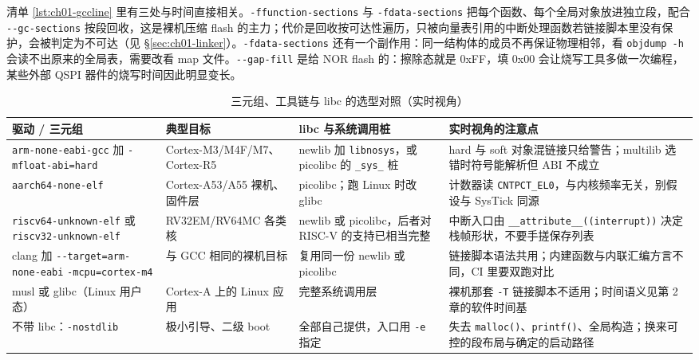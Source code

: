 \documentclass[12pt,a4paper,fontset=fandol]{ctexbook}
\newcommand{\Fn}[1]{\texttt{#1()}}
\newcommand{\Tp}[1]{\texttt{#1}}
\newcommand{\Opt}[1]{\texttt{-\/-#1}}
\newcommand{\Bk}{\discretionary{}{}{}}
\begin{document}
清单 \ref{lst:ch01-gccline} 里有三处与时间直接相关。\Tp{-ffunction-sections} 与 \Tp{-fdata-sections} 把每个函数、每个全局对象放进独立段，配合 \Opt{gc-sections} 按段回收，这是裸机压缩 flash 的主力；代价是回收按可达性遍历，只被向量表引用的中断处理函数若链接脚本里没有保护，会被判定为不可达（见 \S\ref{sec:ch01-linker}）。\Tp{-fdata-sections} 还有一个副作用：同一结构体的成员不再保证物理相邻，看 \Tp{objdump -h} 会读不出原来的全局表，需要改看 map 文件。\Opt{gap-fill} 是给 NOR flash 的：擦除态就是 0xFF，填 0x00 会让烧写工具多做一次编程，某些外部 QSPI 器件的烧写时间因此明显变长。

\begin{table}[htbp]
\centering
\caption{三元组、工具链与 libc 的选型对照（实时视角）}
\label{tab:ch01-toolchain}
\begin{tabular}{>{\raggedright\arraybackslash}p{}
                >{\raggedright\arraybackslash}p{}
                >{\raggedright\arraybackslash}p{}
                >{\raggedright\arraybackslash}p{}}
\toprule
驱动 / 三元组 & 典型目标 & libc 与系统调用桩 & 实时视角的注意点 \\
\midrule
\Tp{arm-none-eabi-gcc} 加 \Tp{-mfloat-abi=hard} & Cortex-M3/M4F/M7、Cortex-R5 & newlib 加 \Tp{libnosys}，或 picolibc 的 \Tp{\_sys\_} 桩 & hard 与 soft 对象混链接只给警告；multilib 选错时符号能解析但 ABI 不成立 \\
\Tp{aarch64-none-elf} & Cortex-A53/A55 裸机、固件层 & picolibc；跑 Linux 时改 glibc & 计数器读 \Tp{CNTPCT\_EL0}，与内核频率无关，别假设与 SysTick 同源 \\
\Tp{riscv64-{\Bk}unknown-{\Bk}elf} 或 \Tp{riscv32-{\Bk}unknown-{\Bk}elf} & RV32EM/{\Bk}RV64MC 各类核 & newlib 或 picolibc，后者对 RISC-V 的支持已相当完整 & 中断入口由 \Tp{\_{\Bk}\_{\Bk}attribute\_{\Bk}\_{\Bk}({\Bk}({\Bk}interrupt))} 决定栈帧形状，不要手搓保存列表 \\
clang 加 \Opt{target=arm-{\Bk}none-{\Bk}eabi} \Tp{-{\Bk}mcpu=cortex-{\Bk}m4} & 与 GCC 相同的裸机目标 & 复用同一份 newlib 或 picolibc & 链接脚本语法共用；内建函数与内联汇编方言不同，CI 里要双跑对比 \\
musl 或 glibc（Linux 用户态） & Cortex-A 上的 Linux 应用 & 完整系统调用层 & 裸机那套 \Tp{-T} 链接脚本不适用；时间语义见第 2 章的软件时间基 \\
不带 libc：\Tp{-nostdlib} & 极小引导、二级 boot & 全部自己提供，入口用 \Tp{-e} 指定 & 失去 \Fn{malloc}、\Fn{printf}、全局构造；换来可控的段布局与确定的启动路径 \\
\bottomrule
\end{tabular}
\end{table}
\end{document}
